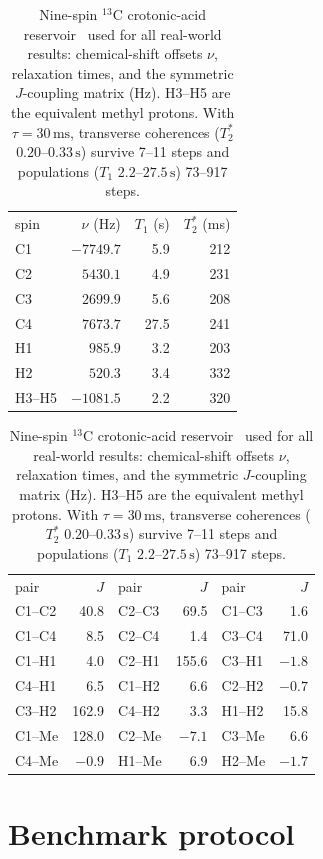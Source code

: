 \documentclass[aps,prresearch,preprint,superscriptaddress,amsmath,amssymb,floatfix]{revtex4-2}
\newcommand{\SI}[2]{\ensuremath{#1\,\mathrm{#2}}}
\newcommand{\SIrange}[3]{\ensuremath{#1\text{--}#2\,\mathrm{#3}}}
\begin{document}
\begin{table}[t]
\caption{\label{tab:crotonic}Nine-spin $^{13}$C crotonic-acid reservoir~\cite{Hou2026}
used for all real-world results: chemical-shift offsets $\nu$, relaxation times, and
the symmetric $J$-coupling matrix (Hz). H3--H5 are the equivalent methyl protons. With
$\tau=\SI{30}{ms}$, transverse coherences ($T_2^\ast$ \SIrange{0.20}{0.33}{s}) survive
7--11 steps and populations ($T_1$ \SIrange{2.2}{27.5}{s}) 73--917 steps.}
\begin{ruledtabular}
\begin{tabular}{lrrr}
spin & $\nu$ (Hz) & $T_1$ (s) & $T_2^\ast$ (ms) \\ \colrule
C1 & $-7749.7$ & 5.9 & 212 \\
C2 & $5430.1$  & 4.9 & 231 \\
C3 & $2699.9$  & 5.6 & 208 \\
C4 & $7673.7$  & 27.5& 241 \\
H1 & $985.9$   & 3.2 & 203 \\
H2 & $520.3$   & 3.4 & 332 \\
H3--H5 & $-1081.5$ & 2.2 & 320 \\
\end{tabular}
\end{ruledtabular}
\begin{ruledtabular}
\begin{tabular}{lr|lr|lr}
pair & $J$ & pair & $J$ & pair & $J$\\ \colrule
C1--C2 & 40.8  & C2--C3 & 69.5  & C1--C3 & 1.6 \\
C1--C4 & 8.5   & C2--C4 & 1.4   & C3--C4 & 71.0 \\
C1--H1 & 4.0   & C2--H1 & 155.6 & C3--H1 & $-1.8$ \\
C4--H1 & 6.5   & C1--H2 & 6.6   & C2--H2 & $-0.7$ \\
C3--H2 & 162.9 & C4--H2 & 3.3   & H1--H2 & 15.8 \\
C1--Me & 128.0 & C2--Me & $-7.1$& C3--Me & 6.6 \\
C4--Me & $-0.9$& H1--Me & 6.9   & H2--Me & $-1.7$ \\
\end{tabular}
\end{ruledtabular}
\end{table}

\section{Benchmark protocol}\label{sec:protocol}
\end{document}
